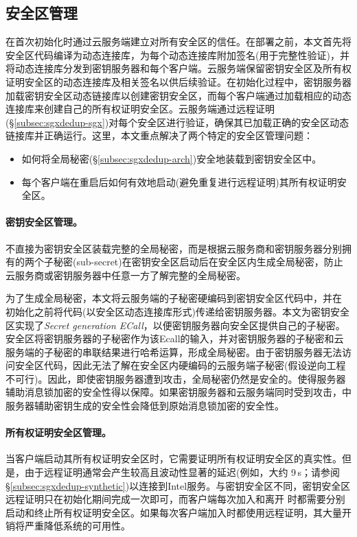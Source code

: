 \subsection{安全区管理}
\label{subsec:sgxdedup-enclave-management}

\sysnameS 在首次初始化时通过云服务端建立对所有安全区的信任。在\sysnameS 部署之前，本文首先将安全区代码编译为动态连接库\cite{sgx}，为每个动态连接库附加签名(用于完整性验证)，并将动态连接库分发到密钥服务器和每个客户端。云服务端保留密钥安全区及所有权证明安全区的动态连接库及相关签名以供后续验证。在初始化过程中，密钥服务器加载密钥安全区动态链接库以创建密钥安全区，而每个客户端通过加载相应的动态连接库来创建自己的所有权证明安全区。云服务端通过远程证明(\S\ref{subsec:sgxdedup-sgx})对每个安全区进行验证，确保其已加载正确的安全区动态链接库并正确运行。这里，本文重点解决了两个特定的安全区管理问题：

\begin{itemize}
    \item 如何将全局秘密(\S\ref{subsec:sgxdedup-arch})安全地装载到密钥安全区中。
    \item 每个客户端在重启后如何有效地启动(避免重复进行远程证明)其所有权证明安全区。
\end{itemize}

\paragraph*{密钥安全区管理。}\sysnameS 不直接为密钥安全区装载完整的全局秘密，而是根据云服务商和密钥服务器分别拥有的两个子秘密(sub-secret)在密钥安全区启动后在安全区内生成全局秘密，防止云服务商或密钥服务器中任意一方了解完整的全局秘密。

为了生成全局秘密，本文将云服务端的子秘密硬编码到密钥安全区代码中，并在 \sysnameS 初始化之前将代码(以安全区动态连接库形式)传递给密钥服务器。本文为密钥安全区实现了\textit{Secret generation ECall}，以便密钥服务器向安全区提供自己的子秘密。安全区将密钥服务器的子秘密作为该Ecall的输入，并对密钥服务器的子秘密和云服务端的子秘密的串联结果进行哈希运算，形成全局秘密。由于密钥服务器无法访问安全区代码，因此无法了解在安全区内硬编码的云服务端子秘密(假设逆向工程不可行)。因此，即使密钥服务器遭到攻击，全局秘密仍然是安全的。使得服务器辅助消息锁加密的安全性得以保障。如果密钥服务器和云服务端同时受到攻击，\sysnameS 中服务器辅助密钥生成的安全性会降低到原始消息锁加密的安全性。

\paragraph*{所有权证明安全区管理。} 当客户端启动其所有权证明安全区时，它​​需要证明所有权证明安全区的真实性。但是，由于远程证明通常会产生较高且波动性显著的延迟(例如，大约 9\,s；请参阅 \S\ref{subsec:sgxdedup-synthetic})以连接到Intel服务。与密钥安全区不同，密钥安全区远程证明只在初始化期间完成一次即可，而客户端每次加入和离开 \sysnameS 时都需要分别启动和终止所有权证明安全区。如果每次客户端加入时都使用远程证明，其大量开销将严重降低\sysnameS 系统的可用性。

